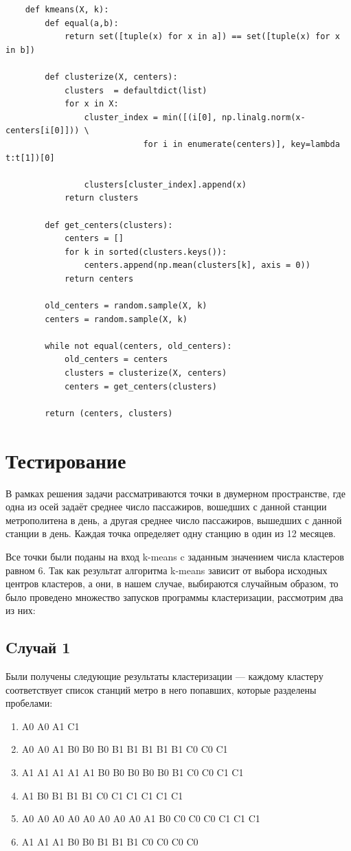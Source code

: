 \documentclass[12pt,a4paper,oneside]{extarticle}
\begin{document}
    \begin{lstlisting}
    def kmeans(X, k):
        def equal(a,b):
            return set([tuple(x) for x in a]) == set([tuple(x) for x in b])

        def clusterize(X, centers):
            clusters  = defaultdict(list)
            for x in X:
                cluster_index = min([(i[0], np.linalg.norm(x-centers[i[0]])) \
                            for i in enumerate(centers)], key=lambda t:t[1])[0]

                clusters[cluster_index].append(x)
            return clusters
        
        def get_centers(clusters):
            centers = []
            for k in sorted(clusters.keys()):
                centers.append(np.mean(clusters[k], axis = 0))
            return centers
            
        old_centers = random.sample(X, k)
        centers = random.sample(X, k)

        while not equal(centers, old_centers):
            old_centers = centers        
            clusters = clusterize(X, centers)        
            centers = get_centers(clusters)

        return (centers, clusters)

    \end{lstlisting}

\section{Тестирование}
    В рамках решения задачи рассматриваются точки в двумерном пространстве, где одна из осей задаёт среднее число пассажиров, вошедших с данной станции метрополитена в день, а другая среднее число пассажиров, вышедших с данной станции в день. Каждая точка определяет одну станцию в один из 12 месяцев.

    Все точки были поданы на вход k-means c заданным значением числа кластеров равном 6. Так как результат алгоритма k-means зависит от выбора исходных центров кластеров, а они, в нашем случае, выбираются случайным образом, то было проведено множество запусков программы кластеризации, рассмотрим два из них:

    \subsection{Cлучай 1}
        Были получены следующие результаты кластеризации --- каждому кластеру соответствует список станций метро в него попавших, которые разделены пробелами:
        \begin{enumerate}
            \item A0 A0 A1 C1
            \item A0 A0 A1 B0 B0 B0 B1 B1 B1 B1 B1 C0 C0 C1
            \item A1 A1 A1 A1 A1 B0 B0 B0 B0 B0 B1 C0 C0 C1 C1
            \item A1 B0 B1 B1 B1 C0 C1 C1 C1 C1 C1
            \item A0 A0 A0 A0 A0 A0 A0 A0 A1 B0 C0 C0 C0 C1 C1 C1
            \item A1 A1 A1 B0 B0 B1 B1 B1 C0 C0 C0 C0
        \end{enumerate}
\end{document}

